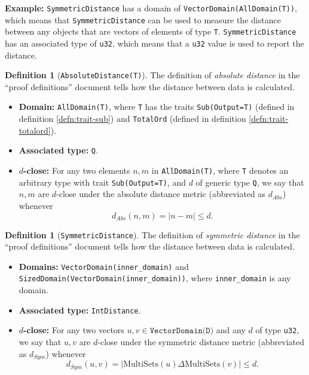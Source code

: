 \documentclass[11pt,a4paper]{article}
\theoremstyle{definition}
\newtheorem{definition}[theorem]{Definition}
\newcommand{\MultiSet}{\mathrm{MultiSets}}
\newcommand{\metricDefn}[1]{The definition of \emph{#1} in the ``proof definitions'' document tells how the distance between data is calculated.}
\begin{document}
\textbf{Example:} \texttt{SymmetricDistance} has a domain of \texttt{VectorDomain(AllDomain(T))}, which means that \texttt{SymmetricDistance} can be used to measure the distance between any objects that are vectors of elements of type \texttt{T}. \texttt{SymmetricDistance} has an associated type of \texttt{u32}, which means that a \texttt{u32} value is used to report the distance.


\begin{definition}[\texttt{AbsoluteDistance(T)}]
\metricDefn{absolute distance}
\begin{itemize}
    \item \textbf{Domain:} \texttt{AllDomain(T)}, where \texttt{T} has the traits \texttt{Sub(Output=T)} (defined in definition \ref{defn:trait-sub}) and \texttt{TotalOrd} (defined in definition \ref{defn:trait-totalord}).
    \item \textbf{Associated type:} \texttt{Q}.
    \item \textbf{$d$-close:} For any two elements $n, m$ in \texttt{AllDomain(T)}, where \texttt{T} denotes an arbitrary type with trait \texttt{Sub(Output=T)}, and $d$ of generic type \texttt{Q}, we say that $n, m$ are $d$-close under the absolute distance metric (abbreviated as $d_{Abs}$) whenever
    \[
        d_{Abs}(n, m) = |n-m| \leq d.
    \]
\end{itemize}
\end{definition}

\begin{definition}[\texttt{SymmetricDistance}]
\metricDefn{symmetric distance} 
\begin{itemize}
    \item \textbf{Domains:} \texttt{VectorDomain(inner\_domain)} and \texttt{SizedDomain(VectorDomain(inner\_domain))}, where \texttt{inner\_domain} is any domain.
    
    \item \textbf{Associated type:} \texttt{IntDistance}.
    \item \textbf{$d$-close:} For any two vectors $u, v \in \texttt{VectorDomain(D)}$ and any $d$ of type \texttt{u32}, we say that $u, v$ are $d$-close under the symmetric distance metric (abbreviated as $d_{Sym}$) whenever 
    \[
        d_{Sym}(u, v) = |\MultiSet(u) \Delta \MultiSet(v)| \leq d.
    \]
\end{itemize}
\end{definition}
\end{document}
